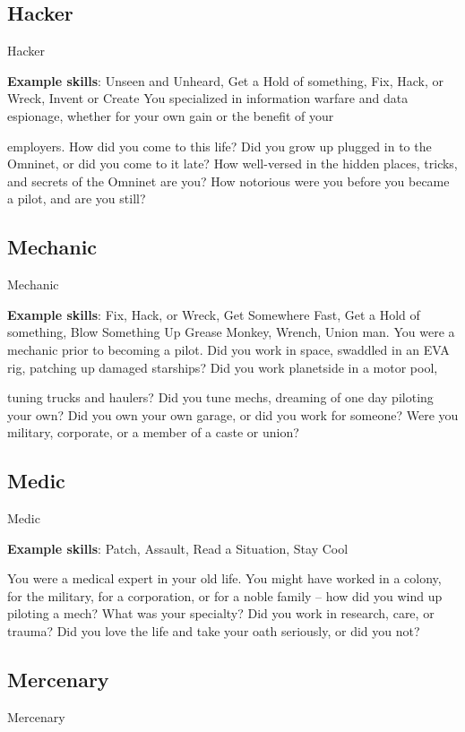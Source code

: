 \subsection{Hacker}
                                                     Hacker

\textbf{Example skills}: Unseen and Unheard, Get a Hold of something, Fix, Hack, or Wreck, Invent or
Create
You specialized in information warfare and data espionage, whether for your own gain or the benefit of your

employers. How did you come to this life? Did you grow up plugged in to the Omninet, or did you come to
it late? How well-versed in the hidden places, tricks, and secrets of the Omninet are you? How notorious
were you before you became a pilot, and are you still?

\subsection{Mechanic}
                                                   Mechanic

\textbf{Example skills}: Fix, Hack, or Wreck, Get Somewhere Fast, Get a Hold of something, Blow
Something Up
Grease Monkey, Wrench, Union man. You were a mechanic prior to becoming a pilot. Did you work in
space, swaddled in an EVA rig, patching up damaged starships? Did you work planetside in a motor pool,

tuning trucks and haulers? Did you tune mechs, dreaming of one day piloting your own? Did you own your
own garage, or did you work for someone? Were you military, corporate, or a member of a caste or union?

\subsection{Medic}
                                                      Medic

\textbf{Example skills}: Patch, Assault, Read a Situation, Stay Cool




You were a medical expert in your old life. You might have worked in a colony, for the military, for a
corporation, or for a noble family -- how did you wind up piloting a mech? What was your specialty? Did
you work in research, care, or trauma? Did you love the life and take your oath seriously, or did you not?

\subsection{Mercenary}
                                                    Mercenary

